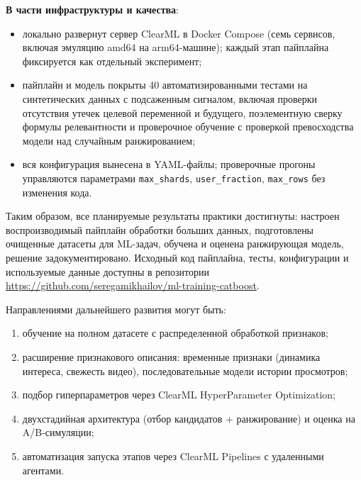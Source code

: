 \textbf{В части инфраструктуры и качества}:
\begin{itemize}
    \item локально развернут сервер ClearML в Docker Compose (семь сервисов, включая эмуляцию amd64 на arm64-машине); каждый этап пайплайна фиксируется как отдельный эксперимент;
    \item пайплайн и модель покрыты 40 автоматизированными тестами на синтетических данных с подсаженным сигналом, включая проверки отсутствия утечек целевой переменной и будущего, поэлементную сверку формулы релевантности и проверочное обучение с проверкой превосходства модели над случайным ранжированием;
    \item вся конфигурация вынесена в YAML-файлы; проверочные прогоны управляются параметрами \texttt{max\_shards}, \texttt{user\_fraction}, \texttt{max\_rows} без изменения кода.
\end{itemize}

Таким образом, все планируемые результаты практики достигнуты: настроен воспроизводимый пайплайн обработки больших данных, подготовлены очищенные датасеты для ML-задач, обучена и оценена ранжирующая модель, решение задокументировано.
Исходный код пайплайна, тесты, конфигурации и используемые данные доступны в репозитории \url{https://github.com/seregamikhailov/ml-training-catboost}.

Направлениями дальнейшего развития могут быть:
\begin{enumerate}
    \item обучение на полном датасете с распределенной обработкой признаков;
    \item расширение признакового описания: временные признаки (динамика интереса, свежесть видео), последовательные модели истории просмотров;
    \item подбор гиперпараметров через ClearML HyperParameter Optimization;
    \item двухстадийная архитектура (отбор кандидатов + ранжирование) и оценка на A/B-симуляции;
    \item автоматизация запуска этапов через ClearML Pipelines с удаленными агентами.
\end{enumerate}
